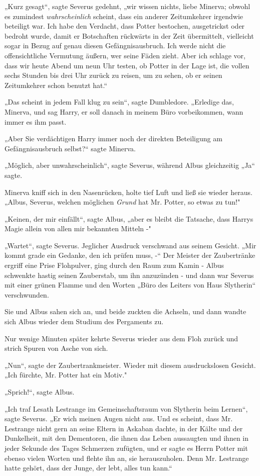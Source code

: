 {„Kurz gesagt“, sagte Severus gedehnt, „wir wissen nichts, liebe Minerva; obwohl es zumindest \emph{wahrscheinlich} scheint, dass ein anderer Zeitumkehrer irgendwie beteiligt war. Ich habe den Verdacht, dass Potter bestochen, ausgetrickst oder bedroht wurde, damit er Botschaften rückwärts in der Zeit übermittelt, vielleicht sogar in Bezug auf genau diesen Gefängnisausbruch. Ich werde nicht die offensichtliche Vermutung äußern, wer seine Fäden zieht. Aber ich schlage vor, dass wir heute Abend um neun Uhr testen, ob Potter in der Lage ist, die vollen sechs Stunden bis drei Uhr zurück zu reisen, um zu sehen, ob er seinen Zeitumkehrer schon benutzt hat.“

„Das scheint in jedem Fall klug zu sein“, sagte Dumbledore. „Erledige das, Minerva, und sag Harry, er soll danach in meinem Büro vorbeikommen, wann immer es ihm passt.

„Aber Sie verdächtigen Harry immer noch der direkten Beteiligung am Gefängnisausbruch selbst?“ sagte Minerva.

„Möglich, aber unwahrscheinlich“, sagte Severus, während Albus gleichzeitig „Ja“ sagte.

Minerva kniff sich in den Nasenrücken, holte tief Luft und ließ sie wieder heraus. „Albus, Severus, welchen möglichen \emph{Grund} hat Mr. Potter, so etwas zu tun!"

„Keinen, der mir einfällt“, sagte Albus, „aber es bleibt die Tatsache, dass Harrys Magie allein von allen mir bekannten Mitteln -"

„Wartet“, sagte Severus. Jeglicher Ausdruck verschwand aus seinem Gesicht. „Mir kommt grade ein Gedanke, den ich prüfen muss, -“ Der Meister der Zaubertränke ergriff eine Prise Flohpulver, ging durch den Raum zum Kamin - Albus schwenkte hastig seinen Zauberstab, um ihn anzuzünden - und dann war Severus mit einer grünen Flamme und den Worten „Büro des Leiters von Haus Slytherin“ verschwunden.

Sie und Albus sahen sich an, und beide zuckten die Achseln, und dann wandte sich Albus wieder dem Studium des Pergaments zu.

Nur wenige Minuten später kehrte Severus wieder aus dem Floh zurück und strich Spuren von Asche von sich.

„Nun“, sagte der Zaubertrankmeister. Wieder mit diesem ausdruckslosen Gesicht. „Ich fürchte, Mr. Potter hat ein Motiv."

„Sprich!“, sagte Albus.

„Ich traf Lesath Lestrange im Gemeinschaftsraum von Slytherin beim Lernen“, sagte Severus. „Er wich meinen Augen nicht aus. Und es scheint, dass Mr. Lestrange nicht gern an seine Eltern in Askaban dachte, in der Kälte und der Dunkelheit, mit den Dementoren, die ihnen das Leben aussaugten und ihnen in jeder Sekunde des Tages Schmerzen zufügten, und er sagte es Herrn Potter mit ebenso vielen Worten und flehte ihn an, sie herauszuholen. Denn Mr. Lestrange hatte gehört, dass der Junge, der lebt, alles tun kann.“

}
